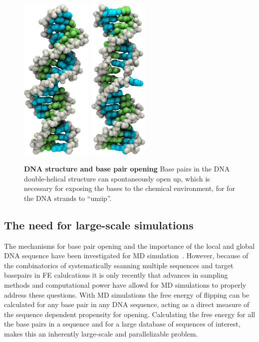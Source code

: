\documentclass[11pt,a4paper]{article}
\begin{document}
\begin{figure}[thbp!]
\includegraphics[height=8cm]{figs/dna-helix-closed.png}
\includegraphics[height=8cm]{figs/dna-helix-flip.png}
\caption{\label{fig:dnastates}
\textbf{DNA structure and base pair opening} Base pairs in the DNA double-helical structure can spontaneously open up, which is necessary for exposing the bases to the chemical environment, for for the DNA strands to ``unzip''.
}
\end{figure}

\subsection{The need for large-scale simulations}
The mechanisms for base pair opening and the importance of the local and global DNA sequence have been investigated for MD simulation~\cite{lindahl2017sequence}. However, because of the combinatorics of systematically ssanning multiple sequences and target basepairs in FE calulcations it is only recently that advances in sampling methods and computational power have allowd for MD simulations to properly address  these questions.
With MD simulations the free energy of flipping can be calculated for any base pair in any DNA sequence, acting as a direct measure of the sequence dependent propensity for opening. Calculating the free energy for all the base pairs in a sequence and for a large database of sequences of interest, makes this an inherently large-scale and parallelizable problem. 
\end{document}
